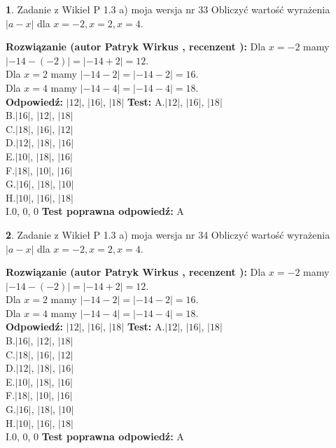 \documentclass[12pt, a4paper]{article}
\theoremstyle{definition} %
\newtheorem{zad}{}
\newcommand{\zadStart}[1]{\begin{zad}#1\newline}
\newcommand{\zadStop}{\end{zad}}
\newcommand{\rozwStart}[2]{\noindent \textbf{Rozwiązanie (autor #1 , recenzent #2): }\newline}
\newcommand{\rozwStop}{\newline}
\newcommand{\odpStart}{\noindent \textbf{Odpowiedź:}\newline}
\newcommand{\odpStop}{\newline}
\newcommand{\testStart}{\noindent \textbf{Test:}\newline}
\newcommand{\testStop}{\newline}
\newcommand{\kluczStart}{\noindent \textbf{Test poprawna odpowiedź:}\newline}
\newcommand{\kluczStop}{\newline}
\begin{document}
\zadStart{Zadanie z Wikieł P 1.3 a) moja wersja nr 33}
Obliczyć wartość wyrażenia $|a - x|$ dla $x=-2,x=2,x=4$.
\zadStop
\rozwStart{Patryk Wirkus}{}
Dla $x = -2$ mamy $|-14 - (-2)| = |-14 + 2| = 12$.\\
Dla $x = 2$ mamy $|-14 - 2| = |-14 - 2| = 16$.\\
Dla $x = 4$ mamy $|-14 - 4| = |-14 - 4| = 18$.\\
\rozwStop
\odpStart
$|12|$, $|16|$, $|18|$
\odpStop
\testStart
A.$|12|$, $|16|$, $|18|$\\
B.$|16|$, $|12|$, $|18|$\\
C.$|18|$, $|16|$, $|12|$\\
D.$|12|$, $|18|$, $|16|$\\
E.$|10|$, $|18|$, $|16|$\\
F.$|18|$, $|10|$, $|16|$\\
G.$|16|$, $|18|$, $|10|$\\
H.$|10|$, $|16|$, $|18|$\\
I.$0$, $0$, $0$
\testStop
\kluczStart
A
\kluczStop



\zadStart{Zadanie z Wikieł P 1.3 a) moja wersja nr 34}
Obliczyć wartość wyrażenia $|a - x|$ dla $x=-2,x=2,x=4$.
\zadStop
\rozwStart{Patryk Wirkus}{}
Dla $x = -2$ mamy $|-14 - (-2)| = |-14 + 2| = 12$.\\
Dla $x = 2$ mamy $|-14 - 2| = |-14 - 2| = 16$.\\
Dla $x = 4$ mamy $|-14 - 4| = |-14 - 4| = 18$.\\
\rozwStop
\odpStart
$|12|$, $|16|$, $|18|$
\odpStop
\testStart
A.$|12|$, $|16|$, $|18|$\\
B.$|16|$, $|12|$, $|18|$\\
C.$|18|$, $|16|$, $|12|$\\
D.$|12|$, $|18|$, $|16|$\\
E.$|10|$, $|18|$, $|16|$\\
F.$|18|$, $|10|$, $|16|$\\
G.$|16|$, $|18|$, $|10|$\\
H.$|10|$, $|16|$, $|18|$\\
I.$0$, $0$, $0$
\testStop
\kluczStart
A
\kluczStop
\end{document}
